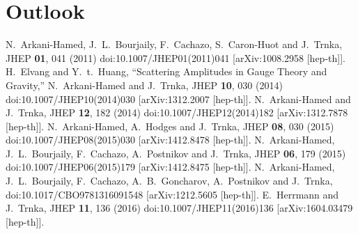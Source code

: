\documentclass[letter,12pt]{article}
\begin{document}
\section{Outlook}
\newpage
\begin{thebibliography}{99}
N.~Arkani-Hamed, J.~L.~Bourjaily, F.~Cachazo, S.~Caron-Huot and J.~Trnka,
JHEP \textbf{01}, 041 (2011)
doi:10.1007/JHEP01(2011)041
[arXiv:1008.2958 [hep-th]].
H.~Elvang and Y.~t.~Huang,
``Scattering Amplitudes in Gauge Theory and Gravity,''
N.~Arkani-Hamed and J.~Trnka,
JHEP \textbf{10}, 030 (2014)
doi:10.1007/JHEP10(2014)030
[arXiv:1312.2007 [hep-th]].
N.~Arkani-Hamed and J.~Trnka,
JHEP \textbf{12}, 182 (2014)
doi:10.1007/JHEP12(2014)182
[arXiv:1312.7878 [hep-th]].
N.~Arkani-Hamed, A.~Hodges and J.~Trnka,
JHEP \textbf{08}, 030 (2015)
doi:10.1007/JHEP08(2015)030
[arXiv:1412.8478 [hep-th]].
N.~Arkani-Hamed, J.~L.~Bourjaily, F.~Cachazo, A.~Postnikov and J.~Trnka,
JHEP \textbf{06}, 179 (2015)
doi:10.1007/JHEP06(2015)179
[arXiv:1412.8475 [hep-th]].
N.~Arkani-Hamed, J.~L.~Bourjaily, F.~Cachazo, A.~B.~Goncharov, A.~Postnikov and J.~Trnka,
doi:10.1017/CBO9781316091548
[arXiv:1212.5605 [hep-th]].
E.~Herrmann and J.~Trnka,
JHEP \textbf{11}, 136 (2016)
doi:10.1007/JHEP11(2016)136
[arXiv:1604.03479 [hep-th]].
\end{thebibliography}
\end{document}
